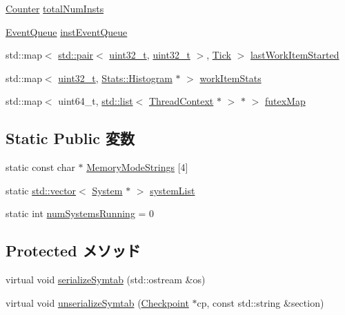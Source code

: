\begin{DoxyCompactItemize}
\item 
\hyperlink{base_2types_8hh_ae1475755791765b8e6f6a8bb091e273e}{Counter} \hyperlink{classSystem_ac59cc9ac6419c90b7add2f0dff8babc9}{totalNumInsts}
\item 
\hyperlink{classEventQueue}{EventQueue} \hyperlink{classSystem_a05694f19dc768ad2378b58790c870f61}{instEventQueue}
\item 
std::map$<$ \hyperlink{classstd_1_1pair}{std::pair}$<$ \hyperlink{Type_8hh_a435d1572bf3f880d55459d9805097f62}{uint32\_\-t}, \hyperlink{Type_8hh_a435d1572bf3f880d55459d9805097f62}{uint32\_\-t} $>$, \hyperlink{base_2types_8hh_a5c8ed81b7d238c9083e1037ba6d61643}{Tick} $>$ \hyperlink{classSystem_a465e763cb54f007726f9b8c35e6638b3}{lastWorkItemStarted}
\item 
std::map$<$ \hyperlink{Type_8hh_a435d1572bf3f880d55459d9805097f62}{uint32\_\-t}, \hyperlink{classStats_1_1Histogram}{Stats::Histogram} $\ast$ $>$ \hyperlink{classSystem_a55a97611b6d940c8f1a15c49293ab7c7}{workItemStats}
\item 
std::map$<$ uint64\_\-t, \hyperlink{classstd_1_1list}{std::list}$<$ \hyperlink{classThreadContext}{ThreadContext} $\ast$ $>$ $\ast$ $>$ \hyperlink{classSystem_a0c17191d1d61a14d28a4d2ecd11beeff}{futexMap}
\end{DoxyCompactItemize}
\subsection*{Static Public 変数}
\begin{DoxyCompactItemize}
\item 
static const char $\ast$ \hyperlink{classSystem_a166de98735762528d9fd0d7cbd0ff5db}{MemoryModeStrings} \mbox{[}4\mbox{]}
\item 
static \hyperlink{classstd_1_1vector}{std::vector}$<$ \hyperlink{classSystem_1_1System}{System} $\ast$ $>$ \hyperlink{classSystem_a2ccf318c5f6beb8a1697389782c1f2bf}{systemList}
\item 
static int \hyperlink{classSystem_a1adea9b3072c7e8d2d045b275c8e37e7}{numSystemsRunning} = 0
\end{DoxyCompactItemize}
\subsection*{Protected メソッド}
\begin{DoxyCompactItemize}
\item 
virtual void \hyperlink{classSystem_a4a6e514fbf1ef35f9a914680884cedef}{serializeSymtab} (std::ostream \&os)
\item 
virtual void \hyperlink{classSystem_a3536a2e47acf307ec65515712f0e2b2d}{unserializeSymtab} (\hyperlink{classCheckpoint}{Checkpoint} $\ast$cp, const std::string \&section)
\end{DoxyCompactItemize}

